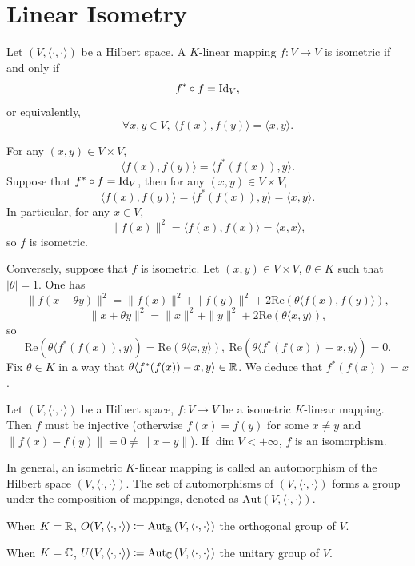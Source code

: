 \section{Linear Isometry}

\begin{propositionenv}
    Let $(V,\langle\cdot,\cdot\rangle)$ be a Hilbert space.
    A $K$-linear mapping $f : V\rightarrow V$ is isometric if and only if
    $$ f^*\circ f = \operatorname{\mathrm{Id}}_V,$$
    or equivalently, 
    $$ \forall x,y\in V, \ \langle f(x),f(y)\rangle = \langle x,y\rangle.$$
\end{propositionenv}
\begin{proofenv}
    For any $(x,y)\in V\times V$,
    $$ \langle f(x),f(y)\rangle = \langle f^*(f(x)),y\rangle .$$
    Suppose that $f^*\circ f = \operatorname{\mathrm{Id}}_V$, then for any $(x,y)\in V\times V$,
    $$ \langle f(x),f(y)\rangle = \langle f^*(f(x)),y\rangle = \langle x,y\rangle.$$
    In particular, for any $x\in V$, 
    $$ \| f(x)\|^2 = \langle f(x),f(x)\rangle = \langle x,x\rangle,$$
    so $f$ is isometric.

    \quad Conversely, suppose that $f$ is isometric.
    Let $(x,y)\in V\times V$, $\theta \in K$ such that $|\theta| = 1$.
    One has
    $$ \|f(x+\theta y)\|^2 = \|f(x)\|^2 + \|f(y)\|^2 + 2 \mathrm{Re} \left(\theta \langle f(x),f(y)\rangle\right),$$
    $$ \| x+ \theta y\|^2 = \|x\|^2 + \|y \|^2 + 2 \mathrm{Re} \left(\theta \langle x,y\rangle\right),$$
    so 
    $$ \mathrm{Re} \left(\theta \langle f^*(f(x)),y \rangle\right) = \mathrm{Re}(\theta\langle x,y\rangle),\ \mathrm{Re} \left(\theta \langle f^*(f(x)) - x,y\rangle\right) = 0.$$
    Fix $\theta\in K$ in a way that $\theta \langle f^*(f(x)) - x,y\rangle \in \mathbb{R}$.
    We deduce that $f^*(f(x)) = x$.
\end{proofenv}

\begin{remark}
    Let $(V,\langle\cdot,\cdot\rangle)$ be a Hilbert space,
    $f: V\rightarrow V$ be a isometric $K$-linear mapping.
    Then $f$ must be injective (otherwise $f(x) = f(y)$ for some $x\neq y$ and $\| f(x) - f(y)\| = 0 \neq \|x - y\|$).
    If $\dim V < +\infty$, $f$ is an isomorphism.
    
    \quad In general, an isometric $K$-linear mapping is called an automorphism of the Hilbert space $\left(V, \langle\cdot, \cdot\rangle\right)$.
    The set of automorphisms of $\left(V, \langle\cdot, \cdot\rangle\right)$ forms a group under the composition of mappings, denoted as $\mathrm{Aut}\left(V, \langle\cdot, \cdot\rangle\right)$.
    
    \quad When $K = \mathbb{R}$, $O(V,\langle\cdot,\cdot\rangle)\coloneq\mathrm{Aut}_{\mathbb{R}} \left(V, \langle\cdot, \cdot\rangle\right)$ the orthogonal group of $V$.
    
    \quad When $K = \mathbb{C}$, $U(V,\langle\cdot,\cdot\rangle)\coloneq\mathrm{Aut}_{\mathbb{C}} \left(V, \langle\cdot, \cdot\rangle\right)$ the unitary group of $V$.
\end{remark}

